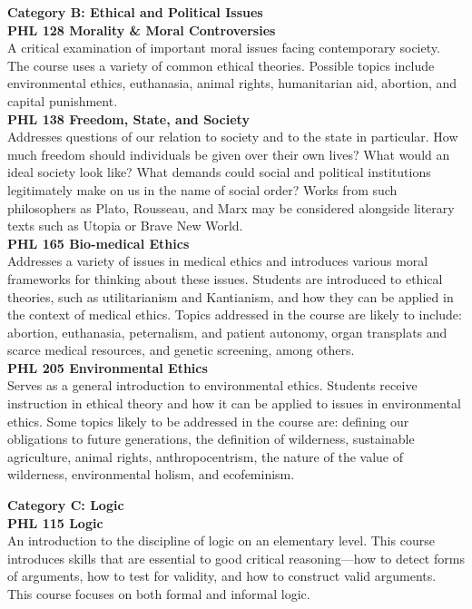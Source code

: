 \documentclass[
  letterpaper,
]{scrbook}
\begin{document}
\textbf{Category B: Ethical and Political Issues}\\
\textbf{PHL 128 Morality \& Moral Controversies}\\
A critical examination of important moral issues facing contemporary
society. The course uses a variety of common ethical theories. Possible
topics include environmental ethics, euthanasia, animal rights,
humanitarian aid, abortion, and capital punishment.\\
\textbf{PHL 138 Freedom, State, and Society}\\
Addresses questions of our relation to society and to the state in
particular. How much freedom should individuals be given over their own
lives? What would an ideal society look like? What demands could social
and political institutions legitimately make on us in the name of social
order? Works from such philosophers as Plato, Rousseau, and Marx may be
considered alongside literary texts such as Utopia or Brave New World.\\
\textbf{PHL 165 Bio-medical Ethics}\\
Addresses a variety of issues in medical ethics and introduces various
moral frameworks for thinking about these issues. Students are
introduced to ethical theories, such as utilitarianism and Kantianism,
and how they can be applied in the context of medical ethics. Topics
addressed in the course are likely to include: abortion, euthanasia,
peternalism, and patient autonomy, organ transplats and scarce medical
resources, and genetic screening, among others.\\
\textbf{PHL 205 Environmental Ethics}\\
Serves as a general introduction to environmental ethics. Students
receive instruction in ethical theory and how it can be applied to
issues in environmental ethics. Some topics likely to be addressed in
the course are: defining our obligations to future generations, the
definition of wilderness, sustainable agriculture, animal rights,
anthropocentrism, the nature of the value of wilderness, environmental
holism, and ecofeminism.

\textbf{Category C: Logic}\\
\textbf{PHL 115 Logic}\\
An introduction to the discipline of logic on an elementary level. This
course introduces skills that are essential to good critical
reasoning---how to detect forms of arguments, how to test for validity,
and how to construct valid arguments. This course focuses on both formal
and informal logic.
\end{document}
